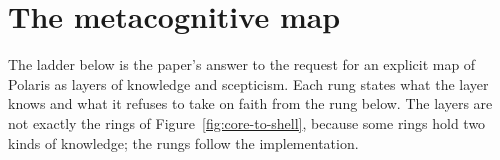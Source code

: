 \section{The metacognitive map}
\label{app:layers}

The ladder below is the paper's answer to the request for an explicit map of Polaris as layers of
knowledge and scepticism. Each rung states what the layer knows and what it refuses to take on faith
from the rung below. The layers are not exactly the rings of Figure~\ref{fig:core-to-shell}, because
some rings hold two kinds of knowledge; the rungs follow the implementation.


